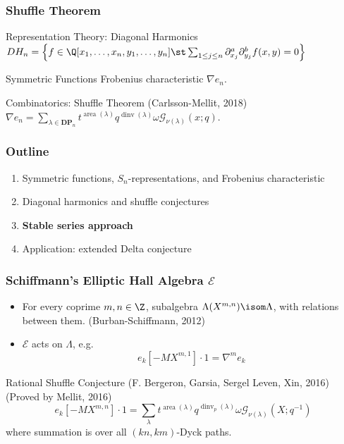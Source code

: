\documentclass{beamer}
\newcommand{\sym}{\Lambda}
\DeclareMathOperator{\area}{area}
\DeclareMathOperator{\dinv}{dinv}
\newcommand{\DP}{\mathbf{DP}}
\newcommand{\PF}{\mathbf{PF}}
\newcommand{\Gcal}{\mathcal{G}}
\newcommand{\Ecal}{{\mathcal E}}
\begin{document}
\begin{frame}
  \frametitle{Shuffle Theorem}
  \begin{block}{Representation Theory: Diagonal Harmonics}
    \(DH_n = \left\{ f \in \Q[x_1,\ldots,x_n,y_1,\ldots,y_n] \st
    \sum_{1 \leq j \leq n} \partial_{x_j}^a \partial_{y_j}^b f(x,y) =
    0 \right\}\)
  \end{block}\pause
  \begin{block}{Symmetric Functions}
    Frobenius characteristic \(\nabla e_n\).
  \end{block}\pause
  \begin{block}{Combinatorics: Shuffle Theorem (Carlsson-Mellit, 2018)}
    \(\nabla e_n = \sum_{\lambda \in \DP_n} t^{\area(\lambda)} q^{\dinv(\lambda)} \omega\Gcal_{\nu(\lambda)}(x;q)\).
  \end{block}
\end{frame}
\begin{frame}
  \frametitle{Outline}
  \begin{enumerate}
  \item Symmetric functions, \(S_n\)-representations, and Frobenius characteristic
  \item Diagonal harmonics and shuffle conjectures
  \item {\bf Stable series approach}
  \item Application: extended Delta conjecture
  \end{enumerate}
\end{frame}
\begin{frame}
  \frametitle{Schiffmann's Elliptic Hall Algebra \(\Ecal\)}
  \begin{itemize}
  \item For every coprime \(m,n \in \Z\), subalgebra \(\sym(X^{m,n})
    \isom \sym\), with relations between them. (Burban-Schiffmann, 2012)\pause
  \item \(\Ecal\) acts on \(\sym\), e.g. \[
      e_k[-MX^{m,1}] \cdot 1 = \nabla^m e_k
    \]\pause
  \end{itemize}
  \begin{block}{Rational Shuffle Conjecture (F. Bergeron, Garsia,
      Sergel Leven, Xin, 2016) (Proved by Mellit, 2016)}
    \[e_k[-MX^{m,n}] \cdot 1 = \sum_\lambda t^{\area(\lambda)}
    q^{\dinv_p(\lambda)} \omega \Gcal_{\nu(\lambda)}(X;q^{-1})\]
  where summation is over all \((kn,km)\)-Dyck paths.
  \end{block}
\end{frame}
\end{document}
